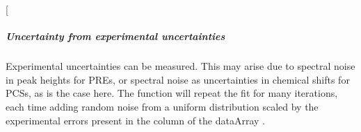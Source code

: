 \documentclass[a4paper,10pt,english,openany,oneside]{sphinxmanual}
\begin{document}
\begin{sphinxVerbatim}[commandchars=\\\{\}]
            
            
               
               
               
                  
                  
                 
               
              
                   
                 
                 
                
\end{sphinxVerbatim}

\sphinxAtStartPar
{} {[}\sphinxcode{\sphinxupquote{models.png}}{]}

\noindent{}


\subparagraph{Uncertainty from experimental uncertainties}
\label{\detokenize{examples/pcs_fit_uncertainty:uncertainty-from-experimental-uncertainties}}
\sphinxAtStartPar
Experimental uncertainties can be measured. This may arise due to spectral noise in peak heights for PREs, or spectral noise as uncertainties in chemical shifts for PCSs, as is the case here. The function {\hyperref[\detokenize{reference/generated/paramagpy.fit.fit_error_monte_carlo:paramagpy.fit.fit_error_monte_carlo}]{}} will repeat the fit for many iterations, each time adding random noise from a uniform distribution scaled by the experimental errors present in the  column of the dataArray .
\end{document}
